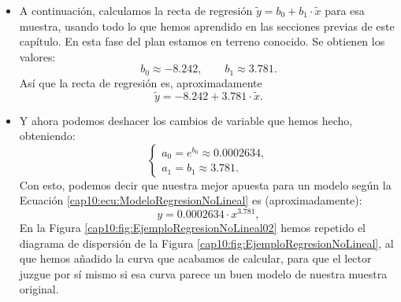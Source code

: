 \begin{ejemplo}
\begin{itemize}
  \item A continuación, calculamos la recta de regresión $\tilde y=b_0+b_1\cdot\tilde x$ para esa muestra, usando todo lo que hemos aprendido en las secciones previas de este capítulo. En esta fase del plan estamos en terreno conocido. Se obtienen los valores:
      \[b_0\approx -8.242,\qquad b_1\approx 3.781.\]
      Así que la recta de regresión es, aproximadamente
      \[\tilde y=-8.242+3.781\cdot\tilde x.\]
  \item Y ahora podemos deshacer los cambios de variable que hemos hecho, obteniendo:
    \[
    \begin{cases}
    a_0=e^{b_0}\approx 0.0002634,\\
    a_1=b_1\approx 3.781.
    \end{cases}
    \]
    Con esto, podemos decir que nuestra mejor apuesta para un modelo según la Ecuación \ref{cap10:ecu:ModeloRegresionNoLineal} es (aproximadamente):
    \[
    y=0.0002634\cdot x^{3.781},
    \]
    En la Figura \ref{cap10:fig:EjemploRegresionNoLineal02} hemos repetido el diagrama de dispersión de la Figura \ref{cap10:fig:EjemploRegresionNoLineal}, al que hemos añadido la curva que acabamos de calcular, para que el lector juzgue por sí mismo si esa curva parece un buen modelo de nuestra muestra original.
\end{itemize}


\end{ejemplo}
